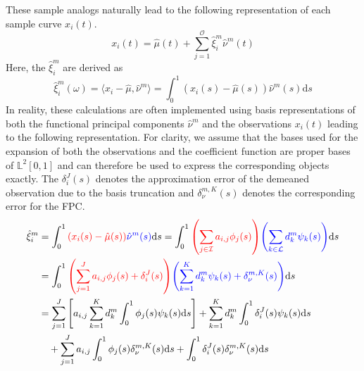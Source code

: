 \documentclass[11pt,twoside,a4paper]{article}
\begin{document}
	These sample analogs naturally lead to the following representation of each sample curve $x_i(t)$.
	\begin{equation}
		x_i(t) = \hat{\mu}(t) + \sum_{j = 1}^{\mathcal{O}} \hat{\xi}_{i}^{m} \hat{\nu}^{m}(t)
	\end{equation}
	Here, the $\hat{\xi}_{i}^m$ are derived as 
	\begin{equation}
		\hat{\xi}_i^m(\omega) = \langle x_i - \hat{\mu}, \hat{\nu}^m\rangle = \int_{0}^{1} \left(x_i(s) - \hat{\mu}(s)\right) \hat{\nu}^m(s) \mathrm{d}s
	\end{equation}
	In reality, these calculations are often implemented using basis representations of both the functional principal components $\hat{\nu}^m$ and the observations $x_i(t)$ leading to the following representation. For clarity, we assume that the bases used for the expansion of both the observations and the coefficient function are proper bases of $\mathbb{L}^2[0,1]$ and can therefore be used to express the corresponding objects exactly. The $\delta_i^J(s)$ denotes the approximation error of the demeaned observation due to the basis truncation and $\delta_{\nu}^{m,K}(s)$ denotes the corresponding error for the FPC.
	\begin{equation}\label{FPCA_basis_expansion}
		\begin{split}
			\hat{\xi}_{i}^m & = \int_{0}^{1} {\color{red}\left( x_i(s) - \hat{\mu}(s)\right)} {\color{blue}\hat{\nu}^m(s)} \mathrm{d}s
			= \int_{0}^{1} {\color{red}\left(\sum_{j \in \mathcal{I}} a_{i,j} \phi_j(s)\right)} {\color{blue}\left(\sum_{k \in \mathcal{L}} d_{k}^m \psi_{k}(s)\right)} \mathrm{d}s \\
			& = \int_{0}^{1} {\color{red}\left(\sum_{j = 1}^{J} a_{i,j} \phi_j(s) + \delta_i^J(s)\right)} {\color{blue}\left(\sum_{k = 1}^{K} d_{k}^m \psi_{k}(s) + \delta_{\nu}^{m,K}(s)\right)} \mathrm{d}s \\
			& = \sum_{j = 1}^{J} \left[a_{i,j}\sum_{k = 1}^{K} d_{k}^m \int_{0}^{1} \phi_j(s) \psi_{k}(s)\mathrm{d}s \right] +  \sum_{k = 1}^{K} d_{k}^m \int_{0}^{1} \delta_i^J(s) \psi_{k}(s) \mathrm{d}s \\
			& \quad + \sum_{j = 1}^{J} a_{i,j} \int_{0}^{1}\phi_j(s) \delta_{\nu}^{m,K}(s) \mathrm{d}s + \int_{0}^{1} \delta_i^J(s) \delta_{\nu}^{m,K}(s) \mathrm{d}s
		\end{split}
	\end{equation}
\end{document}
